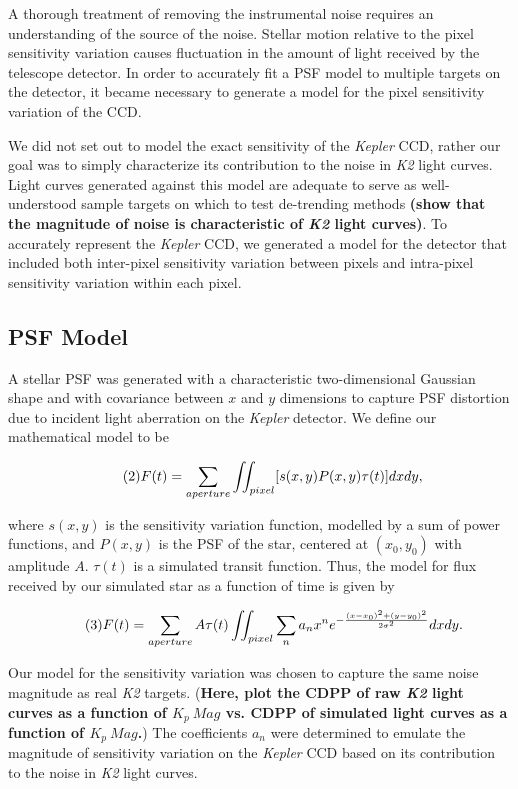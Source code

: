 \documentclass[12pt,preprint]{aastex}
\begin{document}
A thorough treatment of removing the instrumental noise requires an understanding of the source of the noise. Stellar motion relative to the pixel sensitivity variation causes fluctuation in the amount of light received by the telescope detector. In order to accurately fit a PSF model to multiple targets on the detector, it became necessary to generate a model for the pixel sensitivity variation of the CCD.

We did not set out to model the exact sensitivity of the \textit{Kepler} CCD, rather our goal was to simply characterize its contribution to the noise in \textit{K2} light curves. Light curves generated against this model are adequate to serve as well-understood sample targets on which to test de-trending methods \textbf{(show that the magnitude of noise is characteristic of \textit{K2} light curves)}. To accurately represent the \textit{Kepler} CCD, we generated a model for the detector that included both inter-pixel sensitivity variation between pixels and intra-pixel sensitivity variation within each pixel.

\subsection{PSF Model}

A stellar PSF was generated with a characteristic two-dimensional Gaussian shape and with covariance between $x$ and $y$ dimensions to capture PSF distortion due to incident light aberration on the \textit{Kepler} detector. We define our mathematical model to be

\[
\tag{2}
F(t) = \sum_{aperture} \iint_{pixel} [s(x,y)P(x,y)\tau(t)] dxdy,\\
\]

where $s(x,y)$ is the sensitivity variation function, modelled by a sum of power functions, and $P(x,y)$ is the PSF of the star, centered at $(x_0,y_0)$ with amplitude $A$. $\tau (t)$ is a simulated transit function. Thus, the model for flux received by our simulated star as a function of time is given by

\[ 
\tag{3}
F(t) = \sum_{aperture} A\tau(t) \iint_{pixel} \sum_n a_n x^n e^{-\frac{\left(x-x_0 \right)^2+\left( y-y_0 \right)^2}{2\sigma^2}} dxdy. \\
\]

Our model for the sensitivity variation was chosen to capture the same noise magnitude as real \textit{K2} targets. (\textbf{Here, plot the CDPP of raw \textit{K2} light curves as a function of $K_p\ Mag$ vs. CDPP of simulated light curves as a function of $K_p\ Mag$.}) The coefficients $a_n$ were determined to emulate the magnitude of sensitivity variation on the \textit{Kepler} CCD based on its contribution to the noise in \textit{K2} light curves.
\end{document}
